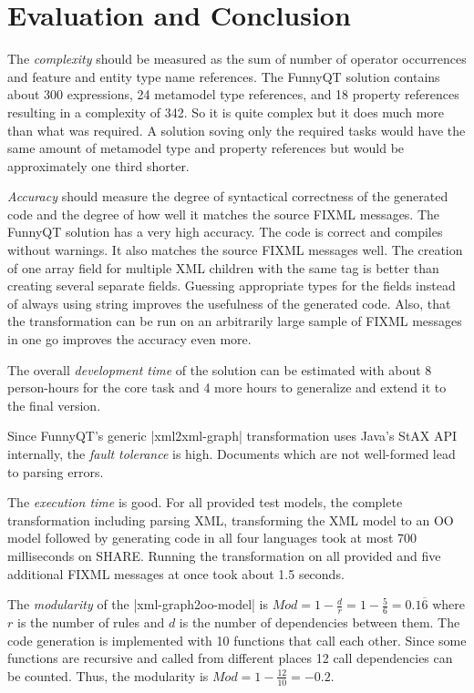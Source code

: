 \documentclass[submission]{eptcs}
\newcommand{\code}{\clojureinline}
\begin{document}
\section{Evaluation and Conclusion}
\label{sec:evaluation}

The \emph{complexity} should be measured as the sum of number of operator
occurrences and feature and entity type name references.  The FunnyQT solution
contains about 300 expressions, 24 metamodel type references, and 18 property
references resulting in a complexity of 342.  So it is quite complex but it
does much more than what was required.  A solution soving only the required
tasks would have the same amount of metamodel type and property references but
would be approximately one third shorter.

\emph{Accuracy} should measure the degree of syntactical correctness of the
generated code and the degree of how well it matches the source FIXML messages.
The FunnyQT solution has a very high accuracy.  The code is correct and
compiles without warnings.  It also matches the source FIXML messages well.
The creation of one array field for multiple XML children with the same tag is
better than creating several separate fields.  Guessing appropriate types for
the fields instead of always using string improves the usefulness of the
generated code.  Also, that the transformation can be run on an arbitrarily
large sample of FIXML messages in one go improves the accuracy even more.

The overall \emph{development time} of the solution can be estimated with about
8 person-hours for the core task and 4 more hours to generalize and extend it
to the final version.

Since FunnyQT's generic \code|xml2xml-graph| transformation uses Java's StAX
API internally, the \emph{fault tolerance} is high.  Documents which are not
well-formed lead to parsing errors.

The \emph{execution time} is good.  For all provided test models, the complete
transformation including parsing XML, transforming the XML model to an OO model
followed by generating code in all four languages took at most 700 milliseconds
on SHARE.  Running the transformation on all provided and five additional FIXML
messages at once took about 1.5 seconds.

The \emph{modularity} of the \code|xml-graph2oo-model| is
\(Mod = 1 - \frac{d}{r} = 1 - \frac{5}{6} = 0.1\overline{6}\)
where \(r\)
is the number of rules and \(d\)
is the number of dependencies between them.  The code generation is implemented
with 10 functions that call each other.  Since some functions are recursive and
called from different places 12 call dependencies can be counted.  Thus, the
modularity is \(Mod = 1 - \frac{12}{10} = -0.2\).
\end{document}
